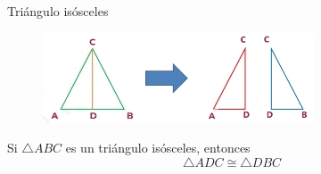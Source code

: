 \begin{infocard}{Triángulo isósceles}
    \begin{figure}[H]
        \centering
        \includegraphics[width=0.9\linewidth]{../images/triangulo_isosceles.png}
    \end{figure}
    Si $\triangle ABC$ es un triángulo isósceles, entonces \[\triangle ADC \cong \triangle DBC\]









\end{infocard}